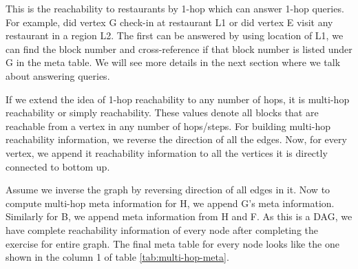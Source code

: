 
{This is the reachability to restaurants by 1-hop which can answer 1-hop queries. For example, did vertex G check-in at restaurant L1 or did vertex E visit any restaurant in a region L2. The first can be answered by using location of L1, we can find the block number and cross-reference if that block number is listed under G in the meta table. We will see more details in the next section where we talk about answering queries. }

If we extend the idea of 1-hop reachability to any number of hops, it is multi-hop reachability or simply reachability. These values denote all blocks that are reachable from a vertex in any number of hops/steps. For building multi-hop reachability information, we reverse the direction of all the edges. Now, for every vertex, we append it reachability information to all the vertices it is directly connected to bottom up.

{Assume we inverse the graph by reversing direction of all edges in it. Now to compute multi-hop meta information for H, we append G's meta information. Similarly for B, we append meta information from H and F. As this is a DAG, we have complete reachability information of every node after completing the exercise for entire graph. The final meta table for every node looks like the one shown in the column 1 of table \ref{tab:multi-hop-meta}. }


